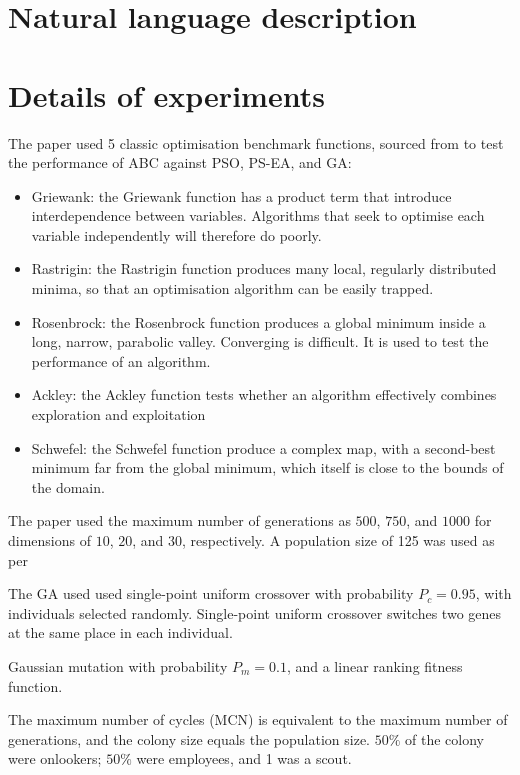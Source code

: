 \documentclass[11pt]{article} %
\begin{document}
\section{Natural language description}

\section{Details of experiments}

The paper used 5 classic optimisation benchmark functions, sourced from \cite{srinivasan_2003} to test the performance of ABC against PSO, PS-EA, and GA:

\begin{itemize}
	\item{Griewank: the Griewank function has a product term that introduce interdependence between variables. Algorithms that seek to optimise each variable independently will therefore do poorly.}
	\item{Rastrigin: the Rastrigin function produces many local, regularly distributed minima, so that an optimisation algorithm can be easily trapped.}
	\item{Rosenbrock: the Rosenbrock function produces a global minimum inside a long, narrow, parabolic valley. Converging is difficult. It is used to test the performance of an algorithm.}
	\item{Ackley: the Ackley function tests whether an algorithm effectively combines exploration and exploitation}
	\item{Schwefel: the Schwefel function produce a complex map, with a second-best minimum far from the global minimum, which itself is close to the bounds of the domain.}
\end{itemize}

The paper used the maximum number of generations as $500$, $750$, and $1000$ for dimensions of $10$, $20$, and $30$, respectively. A population size of 125 was used as per \cite{srinivasan_2003}

The GA used used single-point uniform crossover with probability $P_c = 0.95$, with individuals selected randomly. 
Single-point uniform crossover switches two genes at the same place in each individual. 


Gaussian mutation with probability $P_m = 0.1$, and a linear ranking fitness function.

The maximum number of cycles (MCN) is equivalent to the maximum number of generations, and the colony size equals the population size. $50\%$ of the colony were onlookers; $50\%$ were employees, and 1 was a scout.
\end{document}
